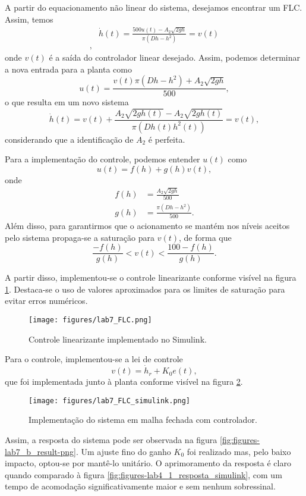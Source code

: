 \documentclass[a4paper]{report}
\begin{document}

A partir do equacionamento não linear do sistema, desejamos encontrar um FLC. Assim, temos
\begin{align*}
    & \dot{h}(t) = \frac{500u(t) - A_2\sqrt{2gh} }{\pi\left( Dh - h^2 \right) } = v(t)\\
,\end{align*}
onde $v(t)$ é a saída do controlador linear desejado. Assim, podemos determinar a nova entrada para a planta como \[
    u(t) = \frac{v(t)\pi\left( Dh - h^2 \right) + A_2\sqrt{2gh} }{500}
,\] o que resulta em um novo sistema \[
\dot{h}(t) = v(t) + \frac{A_2\sqrt{2gh(t)} - A_2\sqrt{2gh(t)}  }{\pi\left( Dh(t) h^2(t) \right) } = v(t)
,\] considerando que a identificação de $A_2$ é perfeita.

Para a implementação do controle, podemos entender $u(t)$ como \[
    u(t) = f(h) + g(h)v(t)
,\] onde
\begin{align*}
    f(h) &= \frac{A_2\sqrt{2gh} }{500} \\
    g(h) &= \frac{\pi\left( Dh - h^2 \right) }{500}
.\end{align*}
Além disso, para garantirmos que o acionamento se mantém nos níveis aceitos pelo sistema propaga-se a saturação para $v(t)$, de forma que \[
    \frac{-f(h)}{g(h)} < v(t) < \frac{100-f(h)}{g(h)}
.\] 

A partir disso, implementou-se o controle linearizante conforme visível na figura \ref{fig:figures-lab7_FLC-png}. Destaca-se o uso de valores aproximados para os limites de saturação para evitar erros numéricos.

\begin{figure}[H]
    \centering
    \texttt{[image: figures/lab7\_FLC.png]}
    \caption{Controle linearizante implementado no Simulink.}
    \label{fig:figures-lab7_FLC-png}
\end{figure}

Para o controle, implementou-se a lei de controle \[
v(t) = \dot{h}_r + K_0e(t)
,\] que foi implementada junto à planta conforme visível na figura \ref{fig:figures-lab7_FLC_simulink-png}.

\begin{figure}[H]
    \centering
    \texttt{[image: figures/lab7\_FLC\_simulink.png]}
    \caption{Implementação do sistema em malha fechada com controlador.}
    \label{fig:figures-lab7_FLC_simulink-png}
\end{figure}

Assim, a resposta do sistema pode ser observada na figura \ref{fig:figures-lab7_b_result-png}. Um ajuste fino do ganho $K_0$ foi realizado mas, pelo baixo impacto, optou-se por mantê-lo unitário. O aprimoramento da resposta é claro quando comparado à figura \ref{fig:figures-lab4_1_resposta_simulink}, com um tempo de acomodação significativamente maior e sem nenhum sobressinal.
\end{document}
